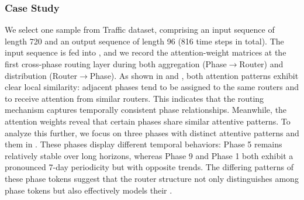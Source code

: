 \subsubsection{Case Study}
\label{sec:exp_case}
We select one sample from Traffic dataset, comprising an input sequence of length 720 and an output sequence of length 96 (816 time steps in total). 
The input sequence is fed into , and we record the attention-weight matrices at the first cross-phase routing layer during both aggregation (Phase$\rightarrow$Router) and distribution (Router$\rightarrow$Phase).
As shown in  and , both attention patterns exhibit clear local similarity: adjacent phases tend to be assigned to the same routers and to receive attention from similar routers.
This indicates that the routing mechanism captures temporally consistent phase relationships. 
Meanwhile, the attention weights reveal that certain phases share similar attentive patterns.
To analyze this further, we focus on three phases with distinct attentive patterns and  them in .
These phases display different temporal behaviors: Phase 5 remains relatively stable over long horizons, whereas Phase 9 and Phase 1 both exhibit a pronounced 7-day periodicity but with opposite trends.
The differing patterns of these phase tokens suggest that the router structure not only distinguishes among phase tokens but also effectively models their .


